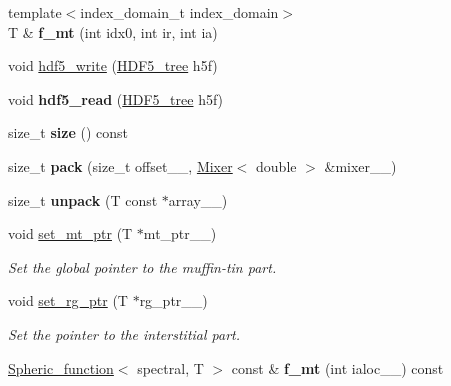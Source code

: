 \begin{DoxyCompactItemize}
\item 
\hypertarget{classsirius_1_1_periodic__function_ac1fdbd883bb6f4ea5109dfa6cd576d9a}{}{\footnotesize template$<$index\+\_\+domain\+\_\+t index\+\_\+domain$>$ }\\T \& {\bfseries f\+\_\+mt} (int idx0, int ir, int ia)\label{classsirius_1_1_periodic__function_ac1fdbd883bb6f4ea5109dfa6cd576d9a}

\item 
void \hyperlink{classsirius_1_1_periodic__function_a2193726e9413497c58533954e2bcdc0c}{hdf5\+\_\+write} (\hyperlink{classsirius_1_1_h_d_f5__tree}{H\+D\+F5\+\_\+tree} h5f)
\item 
\hypertarget{classsirius_1_1_periodic__function_a24aa1f6099d08660c3f39f5d75369b58}{}void {\bfseries hdf5\+\_\+read} (\hyperlink{classsirius_1_1_h_d_f5__tree}{H\+D\+F5\+\_\+tree} h5f)\label{classsirius_1_1_periodic__function_a24aa1f6099d08660c3f39f5d75369b58}

\item 
\hypertarget{classsirius_1_1_periodic__function_a2fee969b2be683ff02caafeea95f8042}{}size\+\_\+t {\bfseries size} () const \label{classsirius_1_1_periodic__function_a2fee969b2be683ff02caafeea95f8042}

\item 
\hypertarget{classsirius_1_1_periodic__function_a945842407c27b3dd951255f16e5d8402}{}size\+\_\+t {\bfseries pack} (size\+\_\+t offset\+\_\+\+\_\+, \hyperlink{classsirius_1_1_mixer}{Mixer}$<$ double $>$ \&mixer\+\_\+\+\_\+)\label{classsirius_1_1_periodic__function_a945842407c27b3dd951255f16e5d8402}

\item 
\hypertarget{classsirius_1_1_periodic__function_a2fd70c6806fb3db88141c0a8afed6d26}{}size\+\_\+t {\bfseries unpack} (T const $\ast$array\+\_\+\+\_\+)\label{classsirius_1_1_periodic__function_a2fd70c6806fb3db88141c0a8afed6d26}

\item 
void \hyperlink{classsirius_1_1_periodic__function_ad4db1af9664290e53c922b13317173a0}{set\+\_\+mt\+\_\+ptr} (T $\ast$mt\+\_\+ptr\+\_\+\+\_\+)
\begin{DoxyCompactList}\small\item\em Set the global pointer to the muffin-\/tin part. \end{DoxyCompactList}\item 
void \hyperlink{classsirius_1_1_periodic__function_a53e2d6564d16b85b67f46c5e498bea4b}{set\+\_\+rg\+\_\+ptr} (T $\ast$rg\+\_\+ptr\+\_\+\+\_\+)
\begin{DoxyCompactList}\small\item\em Set the pointer to the interstitial part. \end{DoxyCompactList}\item 
\hypertarget{classsirius_1_1_periodic__function_a77737585b40fde00ae73ed29b4de748e}{}\hyperlink{classsirius_1_1_spheric__function}{Spheric\+\_\+function}$<$ spectral, T $>$ const \& {\bfseries f\+\_\+mt} (int ialoc\+\_\+\+\_\+) const \label{classsirius_1_1_periodic__function_a77737585b40fde00ae73ed29b4de748e}


\end{DoxyCompactItemize}

